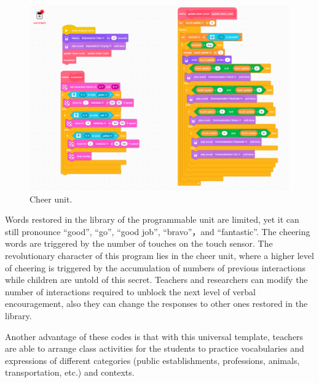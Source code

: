 \documentclass[english]{textolivre}
\begin{document}
\begin{figure}[h!]
\centering
\begin{minipage}{.85\textwidth}
 \includegraphics[width=\textwidth]{Fig2.png}
 \caption{Cheer unit.}
 \label{fig02}
\end{minipage}
\end{figure}

Words restored in the library of the programmable unit are limited, yet it can still pronounce “good”, “go”, “good job”, “bravo”，and “fantastic”. The cheering words are triggered by the number of touches on the touch sensor. The revolutionary character of this program lies in the cheer unit, where a higher level of cheering is triggered by the accumulation of numbers of previous interactions while children are untold of this secret. Teachers and researchers can modify the number of interactions required to unblock the next level of verbal encouragement, also they can change the responses to other ones restored in the library.

Another advantage of these codes is that with this universal template, teachers are able to arrange class activities for the students to practice vocabularies and expressions of different categories (public establishments, professions, animals, transportation, etc.) and contexts.
\end{document}
